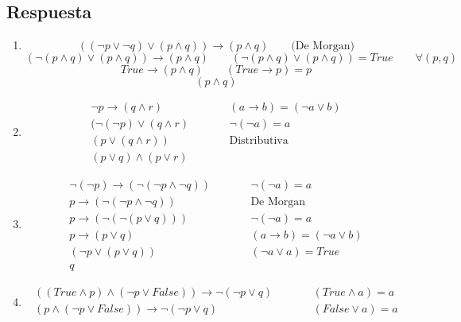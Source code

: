 \documentclass[a4paper]{article}
\begin{document}
\subsection*{Respuesta}

\begin{enumerate}[label=\alph*)]
\item \begin{displaymath}
((\neg p\vee \neg q)\vee (p\wedge q))\rightarrow (p\wedge q) \qquad \textrm{(De Morgan)}
\end{displaymath}
\begin{displaymath}
( \neg (p \wedge q) \vee (p\wedge q))\rightarrow (p\wedge q) \qquad (\neg (p \wedge q) \vee (p\wedge q))=True \qquad \forall (p,q)
\end{displaymath}
\begin{displaymath}
True \rightarrow (p\wedge q) \qquad (True \rightarrow p )=p
\end{displaymath}
\begin{displaymath}
(p\wedge q)
\end{displaymath}
\item \begin{align*}
\neg p \rightarrow (q\wedge r) & \qquad & (a \rightarrow b)=(\neg a \vee b)\\
(\neg (\neg p) \vee (q\wedge r) & \qquad & \neg (\neg a)=a \\
(p \vee (q\wedge r)) & \qquad & \textrm{Distributiva}\\
(p\vee q)\wedge (p\vee r) &
\end{align*}
\item \begin{align*}
\neg (\neg p)\rightarrow (\neg (\neg p \wedge \neg q)) & \qquad & \neg (\neg a)=a\\
 p\rightarrow (\neg (\neg p \wedge \neg q)) & \qquad & \textrm{De Morgan}\\
 p\rightarrow (\neg (\neg( p \vee q))) & \qquad & \neg (\neg a)=a\\
 p\rightarrow ( p \vee q) & \qquad & (a \rightarrow b)=(\neg a \vee b)\\
 (\neg p \vee ( p \vee q)) & \qquad & (\neg a \vee a)=True\\
 q
\end{align*}
\item \begin{align*}
((True \wedge p) \wedge (\neg p \vee False))\rightarrow \neg (\neg p\vee q) & \qquad & (True \wedge a)=a\\
(p \wedge (\neg p \vee False))\rightarrow \neg (\neg p\vee q) & \qquad & (False \vee a)=a\\

\end{align*}
\end{enumerate}
\end{document}
